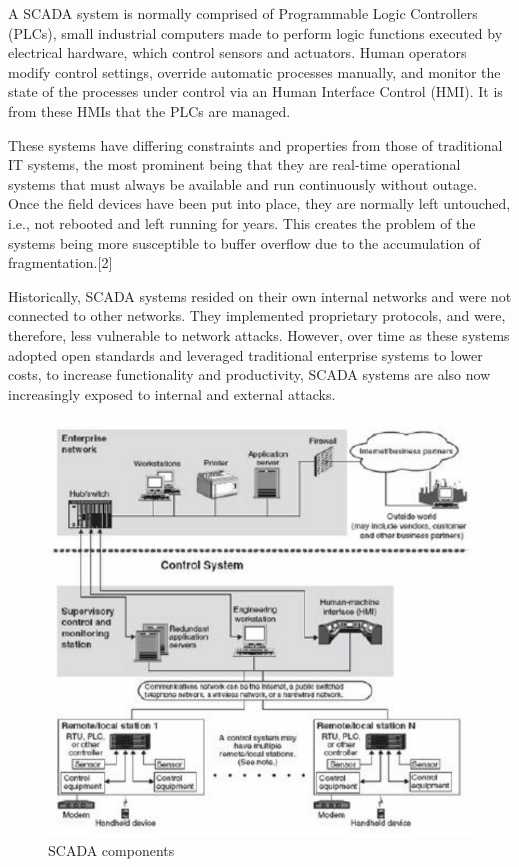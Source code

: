 \documentclass[11pt,]{article}
\begin{document}
A SCADA system is normally comprised of Programmable Logic Controllers
(PLCs), small industrial computers made to perform logic functions
executed by electrical hardware, which control sensors and actuators.
Human operators modify control settings, override automatic processes
manually, and monitor the state of the processes under control via an
Human Interface Control (HMI). It is from these HMIs that the PLCs are
managed.

These systems have differing constraints and properties from those of
traditional IT systems, the most prominent being that they are real-time
operational systems that must always be available and run continuously
without outage. Once the field devices have been put into place, they
are normally left untouched, i.e., not rebooted and left running for
years. This creates the problem of the systems being more susceptible to
buffer overflow due to the accumulation of fragmentation.{[}2{]}

Historically, SCADA systems resided on their own internal networks and
were not connected to other networks. They implemented proprietary
protocols, and were, therefore, less vulnerable to network attacks.
However, over time as these systems adopted open standards and leveraged
traditional enterprise systems to lower costs, to increase functionality
and productivity, SCADA systems are also now increasingly exposed to
internal and external attacks.

\begin{figure}

{\centering \includegraphics{thesis_files/figure-latex/unnamed-chunk-4-1} 

}

\caption{SCADA components}\label{fig:unnamed-chunk-4}
\end{figure}
\end{document}
